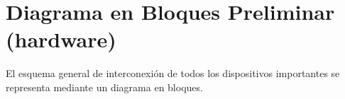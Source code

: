 \section{Diagrama en Bloques Preliminar (hardware)}
    El esquema general de interconexión de todos los dispositivos importantes se
    representa mediante un diagrama en bloques.



